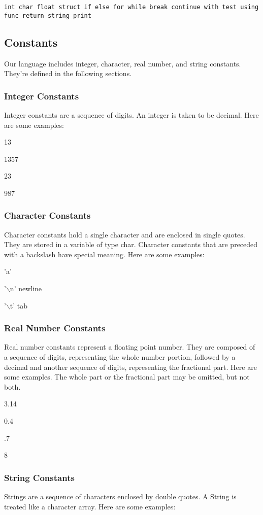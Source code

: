 \documentclass{article}
\begin{document}
\texttt{int char float struct if else for while break continue with test using func return string print}

\subsection{Constants}
Our language includes integer, character, real number, and string constants. They're defined in the following sections.

\subsubsection{Integer Constants}
Integer constants are a sequence of digits. An integer is taken to be decimal. Here are some examples:

13

1357

23

987

\subsubsection{Character Constants}
Character constants hold a single character and are enclosed in single quotes. They are stored in a variable of type char. Character constants that are preceded with a backslash have special meaning. Here are some examples:

'a'

'$\backslash$n' newline

'$\backslash$t' tab


\subsubsection{Real Number Constants}
Real number constants represent a floating point number. They are composed of a sequence of digits, representing the whole number portion, followed by a decimal and another sequence of digits, representing the fractional part. Here are some examples. The whole part or the fractional part may be omitted, but not both.

3.14

0.4

.7

8

\subsubsection{String Constants}
Strings are a sequence of characters enclosed by double quotes. A String is treated like a character array. Here are some examples:
\end{document}
